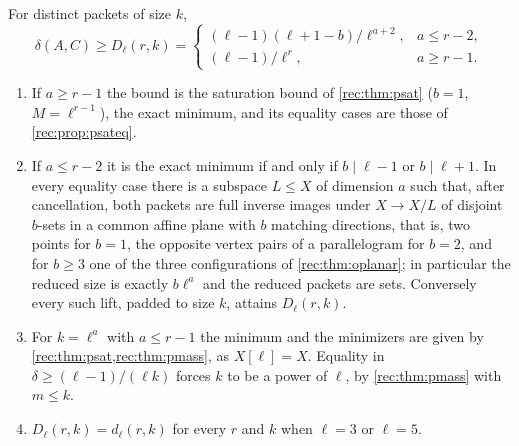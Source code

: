 \begin{theorem}\label{rec:thm:odigit}
For distinct packets of size $k$,
\[
 \delta(A,C)\ge D_\ell(r,k)=\begin{cases}(\ell-1)(\ell+1-b)/\ell^{a+2},&a\le r-2,\\ (\ell-1)/\ell^r,&a\ge r-1.\end{cases}
\]
\begin{enumerate}
\item If $a\ge r-1$ the bound is the saturation bound of \cref{rec:thm:psat} \textup($b=1$, $M=\ell^{r-1}$\textup), the exact minimum,
and its equality cases are those of \cref{rec:prop:psateq}.
\item If $a\le r-2$ it is the exact minimum if and only if $b\mid\ell-1$ or $b\mid\ell+1$. In every equality case there is a
subspace $L\le X$ of dimension $a$ such that, after cancellation, both packets are full inverse images under
$X\to X/L$ of disjoint $b$-sets in a common affine plane with $b$ matching directions, that is, two points for
$b=1$, the opposite vertex pairs of a parallelogram for $b=2$, and for $b\ge3$ one of the three configurations
of \cref{rec:thm:oplanar}; in particular the reduced size is exactly $b\ell^a$ and the reduced packets are sets.
Conversely every such lift, padded to size $k$, attains $D_\ell(r,k)$.
\item For $k=\ell^a$ with $a\le r-1$ the minimum and the minimizers are given by \cref{rec:thm:psat,rec:thm:pmass}, as
$X[\ell]=X$. Equality in $\delta\ge(\ell-1)/(\ell k)$ forces $k$ to be a power of $\ell$, by \cref{rec:thm:pmass} with $m\le k$.
\item $D_\ell(r,k)=d_\ell(r,k)$ for every $r$ and $k$ when $\ell=3$ or $\ell=5$.
\end{enumerate}
\end{theorem}

